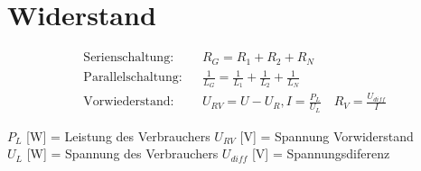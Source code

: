 \section*{Widerstand}

\begin{tcolorbox}[colback=white]
    \begin{align*}
        \text{Serienschaltung:}   &  & R_G = R_1 + R_2 + R_N                                                       \\
        \text{Parallelschaltung:} &  & \frac{1}{L_G} = \frac{1}{L_1} + \frac{1}{L_2} + \frac{1}{L_N}               \\
        \text{Vorwiederstand:}    &  & U_{RV} = U - U_R, I = \frac{P_L}{U_L} \hspace{1em} R_V = \frac{U_{diff}}{I}
    \end{align*}
    \tcblower
    \begin{center}
    \small $P_L$ [W] = Leistung des Verbrauchers \hspace{1em}  $U_{RV}$ [V] = Spannung Vorwiderstand  \\
    $U_L$ [W] = Spannung des Verbrauchers \hspace{0.5em} $U_{diff}$ [V] = Spannungsdiferenz
    \end{center}
\end{tcolorbox}